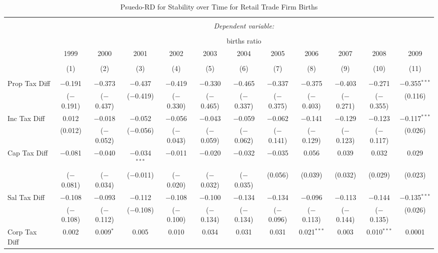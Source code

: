 
\begin{table}[!htbp] \centering 
  \caption{Psuedo-RD for Stability over Time for  Retail Trade Firm Births} 
  \label{44-45year} 
\small 
\begin{tabular}{@{\extracolsep{5pt}}lccccccccccc} 
\\[-1.8ex]\hline 
\hline \\[-1.8ex] 
 & \multicolumn{11}{c}{\textit{Dependent variable:}} \\ 
\cline{2-12} 
\\[-1.8ex] & \multicolumn{11}{c}{births ratio} \\ 
 & 1999 & 2000 & 2001 & 2002 & 2003 & 2004 & 2005 & 2006 & 2007 & 2008 & 2009 \\ 
\\[-1.8ex] & (1) & (2) & (3) & (4) & (5) & (6) & (7) & (8) & (9) & (10) & (11)\\ 
\hline \\[-1.8ex] 
 Prop Tax Diff & $-$0.191 & $-$0.373 & $-$0.437 & $-$0.419 & $-$0.330 & $-$0.465 & $-$0.337 & $-$0.375 & $-$0.403 & $-$0.271 & $-$0.355$^{***}$ \\ 
  & ($-$0.191) & ($-$0.437) & ($-$0.419) & ($-$0.330) & ($-$0.465) & ($-$0.337) & ($-$0.375) & ($-$0.403) & ($-$0.271) & ($-$0.355) & (0.116) \\ 
  Inc Tax Diff & 0.012 & $-$0.018 & $-$0.052 & $-$0.056 & $-$0.043 & $-$0.059 & $-$0.062 & $-$0.141 & $-$0.129 & $-$0.123 & $-$0.117$^{***}$ \\ 
  & (0.012) & ($-$0.052) & ($-$0.056) & ($-$0.043) & ($-$0.059) & ($-$0.062) & ($-$0.141) & ($-$0.129) & ($-$0.123) & ($-$0.117) & (0.026) \\ 
  Cap Tax Diff & $-$0.081 & $-$0.040 & $-$0.034$^{***}$ & $-$0.011 & $-$0.020 & $-$0.032 & $-$0.035 & 0.056 & 0.039 & 0.032 & 0.029 \\ 
  & ($-$0.081) & ($-$0.034) & ($-$0.011) & ($-$0.020) & ($-$0.032) & ($-$0.035) & (0.056) & (0.039) & (0.032) & (0.029) & (0.023) \\ 
  Sal Tax Diff & $-$0.108 & $-$0.093 & $-$0.112 & $-$0.108 & $-$0.100 & $-$0.134 & $-$0.134 & $-$0.096 & $-$0.113 & $-$0.144 & $-$0.135$^{***}$ \\ 
  & ($-$0.108) & ($-$0.112) & ($-$0.108) & ($-$0.100) & ($-$0.134) & ($-$0.134) & ($-$0.096) & ($-$0.113) & ($-$0.144) & ($-$0.135) & (0.026) \\ 
  Corp Tax Diff & 0.002 & 0.009$^{*}$ & 0.005 & 0.010 & 0.034 & 0.031 & 0.031 & 0.021$^{***}$ & 0.003 & 0.010$^{***}$ & 0.0001 \\ 

\end{tabular}
\end{table}
